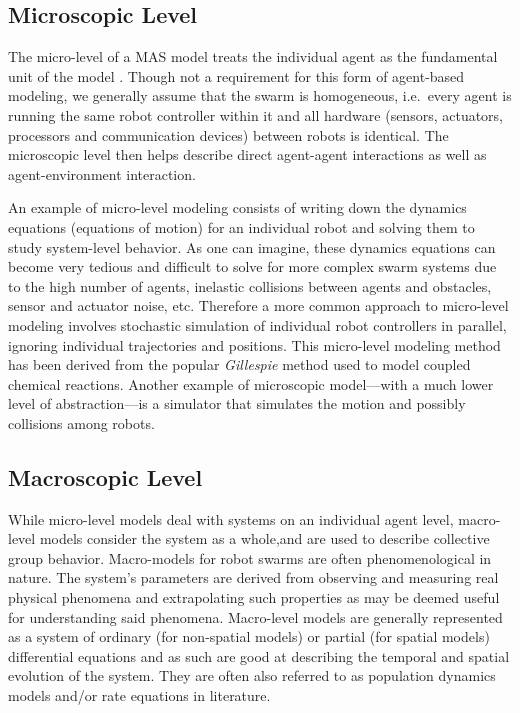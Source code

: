 \documentclass[defaultstyle,12pt]{thesis}
\begin{document}
\subsection{Microscopic Level}
The micro-level of a MAS model treats the individual agent as the fundamental unit of the model \cite{Lerman2001a}. Though not a requirement for this form of agent-based modeling, we generally assume that the swarm is homogeneous, i.e.\ every agent is running the same robot controller within it and all hardware (sensors, actuators, processors and communication devices) between robots is identical. The microscopic level then helps describe direct agent-agent interactions as well as agent-environment interaction. 

An example of micro-level modeling consists of writing down the dynamics equations (equations of motion) for an individual robot and solving them to study system-level behavior. As one can imagine, these dynamics equations can become very tedious and difficult to solve for more complex swarm systems due to the high number of agents, inelastic collisions between agents and obstacles, sensor and actuator noise, etc. Therefore a more common approach to micro-level modeling involves stochastic simulation of individual robot controllers in parallel, ignoring individual trajectories and positions. This micro-level modeling method has been derived from the popular \emph{Gillespie} method \cite{Gillespie1976,Gillespie1977} used to model coupled chemical reactions. Another example of microscopic model---with a much lower level of abstraction---is a simulator that simulates the motion and possibly collisions among robots. 


\subsection{Macroscopic Level}
While micro-level models deal with systems on an individual agent level, macro-level models consider the system as a whole,and are used to describe collective group behavior. Macro-models for robot swarms are often phenomenological in nature. The system's parameters are derived from observing and measuring real physical phenomena and extrapolating such properties as may be deemed useful for understanding said phenomena. Macro-level models are generally represented as a system of ordinary (for non-spatial models) or partial (for spatial models) differential equations and as such are good at describing the temporal and spatial evolution of the system. They are often also referred to as population dynamics models and/or rate equations in literature.
\end{document}
